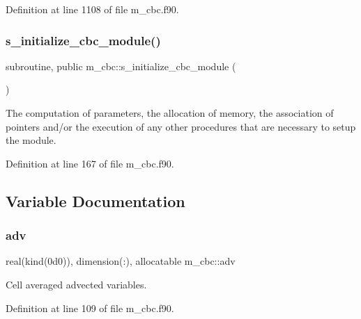 Definition at line 1108 of file m\+\_\+cbc.\+f90.

\mbox{\label{namespacem__cbc_a0afb287e68b0d1d970fd073849525c36}} 
\subsubsection{\texorpdfstring{s\+\_\+initialize\+\_\+cbc\+\_\+module()}{s\_initialize\_cbc\_module()}}
{\footnotesize\ttfamily subroutine, public m\+\_\+cbc\+::s\+\_\+initialize\+\_\+cbc\+\_\+module (\begin{DoxyParamCaption}{ }\end{DoxyParamCaption})}



The computation of parameters, the allocation of memory, the association of pointers and/or the execution of any other procedures that are necessary to setup the module. 



Definition at line 167 of file m\+\_\+cbc.\+f90.



\subsection{Variable Documentation}
\mbox{\label{namespacem__cbc_af8d317b53da9384f50a1c51dd46bc8fe}} 
\subsubsection{\texorpdfstring{adv}{adv}}
{\footnotesize\ttfamily real(kind(0d0)), dimension(\+:), allocatable m\+\_\+cbc\+::adv}



Cell averaged advected variables. 



Definition at line 109 of file m\+\_\+cbc.\+f90.

\mbox{\label{namespacem__cbc_a23d4bcbedc528222237094361a4ff43f}} 
